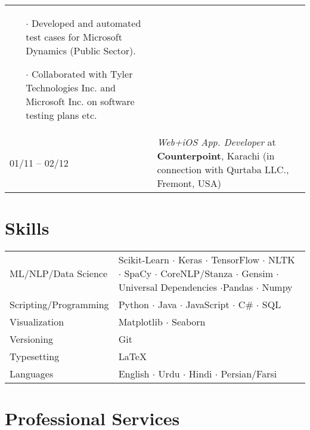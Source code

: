 \documentclass[10pt]{article}
\begin{document}
\begin{tabularx}{\textwidth}{lX}
\vspace{-.5em}
\begin{itemize}\itemsep=-.25em
    \item[$\boldsymbol{\cdot}$] Developed and automated test cases for Microsoft Dynamics (Public Sector).
    \item[$\boldsymbol{\cdot}$] Collaborated with Tyler Technologies Inc. and Microsoft Inc. on software testing plans etc.
\end{itemize}
\\[-.5em]
01/11 – 02/12 & 
\emph{Web+iOS App. Developer} at \textbf{Counterpoint}, Karachi (in connection with Qurtaba LLC., Fremont, USA)
\end{tabularx}

\section*{\textcolor{NavyBlue}{Skills}}

\begin{tabularx}{\textwidth}{lX}
ML/NLP/Data Science & Scikit-Learn $\cdot$ Keras $\cdot$ TensorFlow $\cdot$ NLTK $\cdot$ SpaCy $\cdot$ CoreNLP/Stanza $\cdot$ Gensim $\cdot$ Universal Dependencies $\cdot$\newline Pandas $\cdot$ Numpy\\[16pt]
Scripting/Programming & Python $\cdot$ Java $\cdot$ JavaScript $\cdot$ C\# $\cdot$ SQL\\[.5em]
Visualization & Matplotlib $\cdot$ Seaborn\\[.5em]
Versioning & Git\\[.5em]
Typesetting & \LaTeX\\[.5em]
Languages & English $\cdot$ Urdu $\cdot$ Hindi $\cdot$ Persian/Farsi
\end{tabularx}

\section*{Professional Services}
\end{document}
